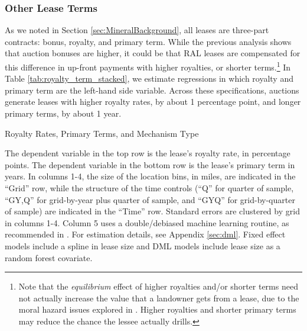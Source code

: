 \documentclass[12pt]{article}
\begin{document}
\subsubsection*{Other Lease Terms \label{subsec:ResultsLeaseChars}}
As we noted in Section \ref{sec:MineralBackground}, all leases are three-part contracts: bonus, royalty, and primary term. While the previous analysis shows that auction bonuses are higher, it could be that RAL leases are compensated for this difference in up-front payments with higher royalties, or shorter terms.\footnote{Note that the \textit{equilibrium} effect of higher royalties and/or shorter terms need not actually increase the value that a landowner gets from a lease, due to the moral hazard issues explored in \cite{herrnstadt}.  Higher royalties and shorter primary terms may reduce the chance the lessee actually drills.} In Table \ref{tab:royalty_term_stacked}, we estimate regressions in which royalty and primary term are the left-hand side variable.  Across these specifications, auctions generate leases with higher royalty rates, by about 1 percentage point, and longer primary terms, by about 1 year.  

\begin{table}[!htbp]
	\begin{center}
	\begin{threeparttable}
	\caption{Royalty Rates, Primary Terms, and Mechanism Type}
	\label{tab:royalty_term_stacked}
	\small
	            
	\footnotesize
		\begin{tablenotes}
			\item The dependent variable in the top row is the lease's royalty rate, in percentage points.  The dependent variable in the bottom row is the lease's primary term in years. In columns 1-4, the size of the location bins, in miles, are indicated in the ``Grid'' row, while the structure of the time controls (``Q'' for quarter of sample, ``GY,Q'' for grid-by-year plus quarter of sample, and ``GYQ'' for grid-by-quarter of sample) are indicated in the ``Time'' row.  Standard errors are clustered by grid in columns 1-4.  Column 5 uses a double/debiased machine learning routine, as recommended in \cite{chernozhukov2018double}.  For estimation details, see Appendix \ref{sec:dml}.  Fixed effect models include a spline in lease size and DML models include lease size as a random forest covariate.      
		\end{tablenotes}
	\end{threeparttable}
	\end{center}
\end{table}
\end{document}
